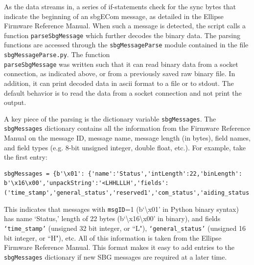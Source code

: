 \documentclass[11pt]{article}
\begin{document}
As the data streams in, a series of if-statements check for the sync bytes that indicate the beginning of an sbgECom message, as detailed in the Ellipse Firmware Reference Manual.  When such a message is detected, the script calls a function \texttt{parseSbgMessage} which further decodes the binary data.  The parsing functions are accessed through the \texttt{sbgMessageParse} module contained in the file \texttt{sbgMessageParse.py}.  The function \texttt{\\parseSbgMessage} was written such that it can read binary data from a socket connection, as indicated above, or from a previously saved raw binary file.  In addition, it can print decoded data in ascii format to a file or to stdout.  The default behavior is to read the data from a socket connection and not print the output.

 A key piece of the parsing is the dictionary variable \texttt{sbgMessages}.  The \texttt{sbgMessages} dictionary contains all the information from the Firmware Reference Manual on the message ID, message name, message length (in bytes), field names, and field types (e.g. 8-bit unsigned integer, double float, etc.). For example, take the first entry:
 \begin{lstlisting}
sbgMessages = {b'\x01': {'name':'Status','intLength':22,'binLength': b'\x16\x00','unpackString':'<LHHLLLH','fields':('time_stamp','general_status','reserved1','com_status','aiding_status','reserved2','reserved3'),...
\end{lstlisting}
 This indicates that messages with \texttt{msgID}=1 (b`\textbackslash x01' in Python binary syntax) has name `Status,' length of 22 bytes (b`\textbackslash x16\textbackslash x00' in binary), and fields \texttt{`time\_stamp'} (unsigned 32 bit integer, or ``L"), \texttt{`general\_status'} (unsigned 16 bit integer, or ``H"), etc.  All of this information is taken from the Ellipse Firmware Reference Manual.  This format makes it easy to add entries to the \texttt{sbgMessages} dictionary if new SBG messages are required at a later time. 
  
\end{document}
